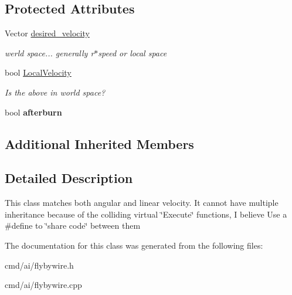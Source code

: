 \subsection*{Protected Attributes}
\begin{DoxyCompactItemize}
\item 
Vector \hyperlink{classOrders_1_1MatchVelocity_a03477a392949f67783ae5b03811ff30b}{desired\+\_\+velocity}\hypertarget{classOrders_1_1MatchVelocity_a03477a392949f67783ae5b03811ff30b}{}\label{classOrders_1_1MatchVelocity_a03477a392949f67783ae5b03811ff30b}

\begin{DoxyCompactList}\small\item\em werld space... generally r$\ast$speed or local space \end{DoxyCompactList}\item 
bool \hyperlink{classOrders_1_1MatchVelocity_a51804555d925398cdaaa92fffe31ae0a}{Local\+Velocity}\hypertarget{classOrders_1_1MatchVelocity_a51804555d925398cdaaa92fffe31ae0a}{}\label{classOrders_1_1MatchVelocity_a51804555d925398cdaaa92fffe31ae0a}

\begin{DoxyCompactList}\small\item\em Is the above in world space? \end{DoxyCompactList}\item 
bool {\bfseries afterburn}\hypertarget{classOrders_1_1MatchVelocity_aa506dedeca89d90d13264b9ce932fdd9}{}\label{classOrders_1_1MatchVelocity_aa506dedeca89d90d13264b9ce932fdd9}

\end{DoxyCompactItemize}
\subsection*{Additional Inherited Members}


\subsection{Detailed Description}
This class matches both angular and linear velocity. It cannot have multiple inheritance because of the colliding virtual \char`\"{}\+Execute\char`\"{} functions, I believe Use a \#define to \char`\"{}share code\char`\"{} between them 

The documentation for this class was generated from the following files\+:\begin{DoxyCompactItemize}
\item 
cmd/ai/flybywire.\+h\item 
cmd/ai/flybywire.\+cpp\end{DoxyCompactItemize}
